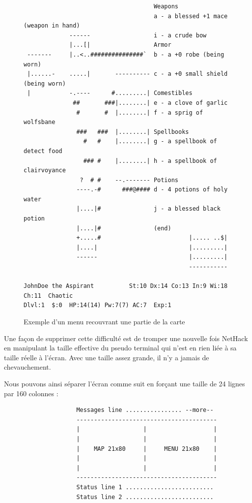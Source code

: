 \documentclass[a4paper,12pt]{article}
\begin{document}
\begin{figure}[h]
	\caption{Exemple d'un menu recouvrant une partie de la carte}
	\begin{verbatim}
                                     Weapons
                                     a - a blessed +1 mace (weapon in hand)
             ------                  i - a crude bow
             |...[|                  Armor
 -------     |..<..###############`  b - a +0 robe (being worn)
 |......-    .....|       ---------- c - a +0 small shield (being worn)
 |           -.----      #.........| Comestibles
              ##       ###|........| e - a clove of garlic
               #       #  |........| f - a sprig of wolfsbane
               ###   ###  |........| Spellbooks
                 #   #    |........| g - a spellbook of detect food
                 ### #    |........| h - a spellbook of clairvoyance
                ?  # #    --.------- Potions
               ----.-#      ###@#### d - 4 potions of holy water
               |....|#               j - a blessed black potion
               |....|#               (end) 
               +.....#                         |..... ..$|
               |....|                          |.........|
               ------                          |.........|
                                               -----------

JohnDoe the Aspirant          St:10 Dx:14 Co:13 In:9 Wi:18 Ch:11  Chaotic
Dlvl:1  $:0  HP:14(14) Pw:7(7) AC:7  Exp:1
	\end{verbatim}
\end{figure}

Une façon de supprimer cette difficulté est de tromper une nouvelle fois
NetHack en manipulant la taille effective du pseudo terminal qui n'est en rien
liée à sa taille réelle à l'écran. Avec une taille assez grande, il n'y a
jamais de chevauchement.

Nous pouvons ainsi séparer l'écran comme suit en forçant une taille de 24
lignes par 160 colonnes :

\begin{figure}[H]
\begin{verbatim}
               Messages line ................ --more--
               ----------------------------------------
               |                  |                   |
               |                  |                   |
               |    MAP 21x80     |     MENU 21x80    |
               |                  |                   |
               |                  |                   |
               ----------------------------------------
               Status line 1 .........................
               Status line 2 .........................
\end{verbatim}
\end{figure}
\end{document}
